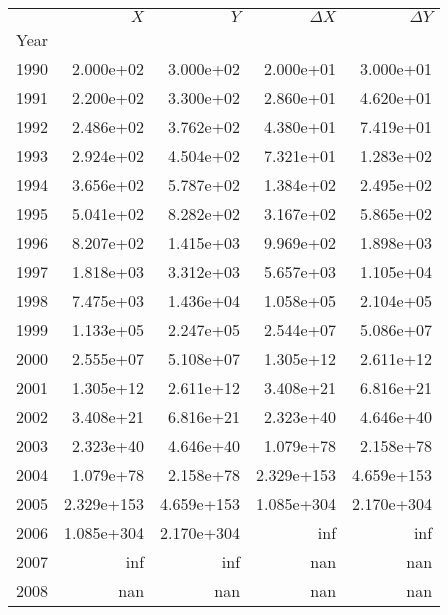 \begin{tabular}{lrrrr}
\toprule
{} &      \(X\) &      \(Y\) & \(\Delta X\) & \(\Delta Y\) \\
Year &            &            &              &              \\
\midrule
1990 &  2.000e+02 &  3.000e+02 &    2.000e+01 &    3.000e+01 \\
1991 &  2.200e+02 &  3.300e+02 &    2.860e+01 &    4.620e+01 \\
1992 &  2.486e+02 &  3.762e+02 &    4.380e+01 &    7.419e+01 \\
1993 &  2.924e+02 &  4.504e+02 &    7.321e+01 &    1.283e+02 \\
1994 &  3.656e+02 &  5.787e+02 &    1.384e+02 &    2.495e+02 \\
1995 &  5.041e+02 &  8.282e+02 &    3.167e+02 &    5.865e+02 \\
1996 &  8.207e+02 &  1.415e+03 &    9.969e+02 &    1.898e+03 \\
1997 &  1.818e+03 &  3.312e+03 &    5.657e+03 &    1.105e+04 \\
1998 &  7.475e+03 &  1.436e+04 &    1.058e+05 &    2.104e+05 \\
1999 &  1.133e+05 &  2.247e+05 &    2.544e+07 &    5.086e+07 \\
2000 &  2.555e+07 &  5.108e+07 &    1.305e+12 &    2.611e+12 \\
2001 &  1.305e+12 &  2.611e+12 &    3.408e+21 &    6.816e+21 \\
2002 &  3.408e+21 &  6.816e+21 &    2.323e+40 &    4.646e+40 \\
2003 &  2.323e+40 &  4.646e+40 &    1.079e+78 &    2.158e+78 \\
2004 &  1.079e+78 &  2.158e+78 &   2.329e+153 &   4.659e+153 \\
2005 & 2.329e+153 & 4.659e+153 &   1.085e+304 &   2.170e+304 \\
2006 & 1.085e+304 & 2.170e+304 &          inf &          inf \\
2007 &        inf &        inf &          nan &          nan \\
2008 &        nan &        nan &          nan &          nan \\
\bottomrule
\end{tabular}
